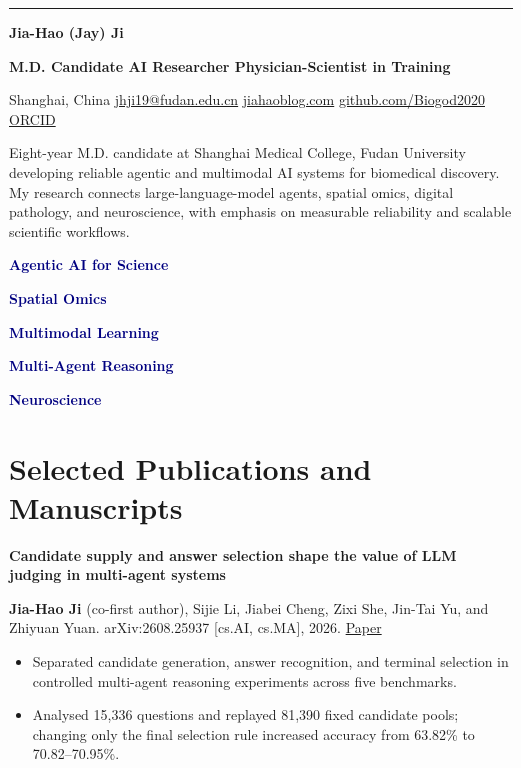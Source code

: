 \documentclass[10pt,a4paper]{article}
\newcommand{\contactsep}{\hspace{0.5em}\textcolor{Rule}{\textbullet}\hspace{0.5em}}
\newcommand{\pubtitle}[1]{\textbf{\color{Ink}#1}}
\newcommand{\meta}[1]{{\small\color{Muted}#1}}
\newcommand{\cvitem}[1]{\item {#1}}
\newenvironment{cvitems}{%
  \begin{itemize}[leftmargin=1.15em,itemsep=0.17em,topsep=0.25em,parsep=0pt,partopsep=0pt,label=\textcolor{Teal}{\raisebox{0.15ex}{\scriptsize\textbullet}}]
}{\end{itemize}}
\newcommand{\tag}[1]{\colorbox{Soft}{\strut\hspace{0.35em}\textcolor{Navy}{\small\bfseries #1}\hspace{0.35em}}}
\begin{document}
\noindent\color{Navy}\rule{\textwidth}{2.2pt}
\vspace{0.7em}

{\fontsize{27}{30}\selectfont\bfseries\color{Ink}Jia-Hao (Jay) Ji}\par
\vspace{0.18em}
{\large\color{Navy}\bfseries M.D. Candidate \textbar{} AI Researcher \textbar{} Physician-Scientist in Training}\par
\vspace{0.55em}
{\small\color{Muted}
Shanghai, China
\contactsep \href{mailto:jhji19@fudan.edu.cn}{jhji19@fudan.edu.cn}
\contactsep \href{https://jiahaoblog.com}{jiahaoblog.com}
\contactsep \href{https://github.com/Biogod2020}{github.com/Biogod2020}
\contactsep \href{https://orcid.org/0009-0007-4647-522X}{ORCID}
}\par

\vspace{0.85em}
\begin{minipage}{\textwidth}
\colorbox{Soft}{%
  \parbox{\dimexpr\textwidth-2\fboxsep\relax}{%
    \vspace{0.35em}
    \small\color{Ink}
    Eight-year M.D. candidate at Shanghai Medical College, Fudan University developing reliable agentic and multimodal AI systems for biomedical discovery. My research connects large-language-model agents, spatial omics, digital pathology, and neuroscience, with emphasis on measurable reliability and scalable scientific workflows.
    \vspace{0.35em}
  }%
}
\end{minipage}

\vspace{0.7em}
\tag{Agentic AI for Science}\hspace{0.45em}
\tag{Spatial Omics}\hspace{0.45em}
\tag{Multimodal Learning}\hspace{0.45em}
\tag{Multi-Agent Reasoning}\hspace{0.45em}
\tag{Neuroscience}

\section*{Selected Publications and Manuscripts}

\pubtitle{Candidate supply and answer selection shape the value of LLM judging in multi-agent systems}\par
\meta{\textbf{Jia-Hao Ji} (co-first author), Sijie Li, Jiabei Cheng, Zixi She, Jin-Tai Yu, and Zhiyuan Yuan. arXiv:2608.25937 [cs.AI, cs.MA], 2026. \href{https://arxiv.org/abs/2608.25937}{Paper}}
\begin{cvitems}
  \cvitem{Separated candidate generation, answer recognition, and terminal selection in controlled multi-agent reasoning experiments across five benchmarks.}
  \cvitem{Analysed 15,336 questions and replayed 81,390 fixed candidate pools; changing only the final selection rule increased accuracy from 63.82\% to 70.82--70.95\%.}
\end{cvitems}
\end{document}
